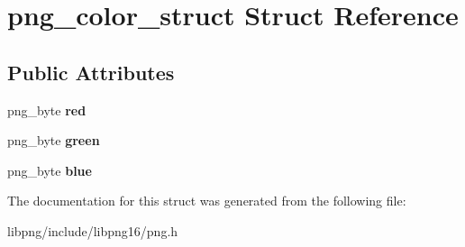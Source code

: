 \hypertarget{structpng__color__struct}{\section{png\-\_\-color\-\_\-struct Struct Reference}
\label{structpng__color__struct}
}
\subsection*{Public Attributes}
\begin{DoxyCompactItemize}
\item 
\hypertarget{structpng__color__struct_ad39dc2d7cb82e3670a3ad397bb4083cb}{png\-\_\-byte {\bfseries red}}\label{structpng__color__struct_ad39dc2d7cb82e3670a3ad397bb4083cb}

\item 
\hypertarget{structpng__color__struct_ada9b5a911b185eaf7c6b87934e9f11ce}{png\-\_\-byte {\bfseries green}}\label{structpng__color__struct_ada9b5a911b185eaf7c6b87934e9f11ce}

\item 
\hypertarget{structpng__color__struct_a528e625b2778e787dc182e5df1164bbc}{png\-\_\-byte {\bfseries blue}}\label{structpng__color__struct_a528e625b2778e787dc182e5df1164bbc}

\end{DoxyCompactItemize}


The documentation for this struct was generated from the following file\-:\begin{DoxyCompactItemize}
\item 
libpng/include/libpng16/png.\-h\end{DoxyCompactItemize}
